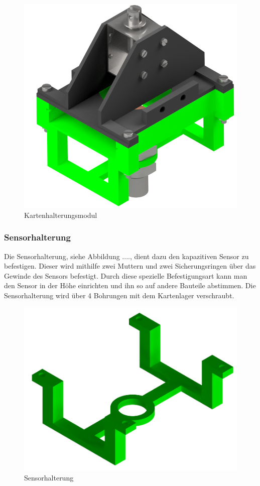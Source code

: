 \begin{figure}
    \centering
    \includegraphics[scale=0.5,page=1]{fig/mech/Kartenhalterungsmodul.png}
    \caption{Kartenhalterungsmodul}
\end{figure}

\subsubsection{Sensorhalterung}
Die Sensorhalterung, siehe Abbildung ...., dient dazu den kapazitiven Sensor zu befestigen. Dieser wird mithilfe zwei Muttern und zwei Sicherungsringen
über das Gewinde des Sensors befestigt. Durch diese spezielle Befestigungsart kann man den Sensor in der Höhe einrichten und ihn so
auf andere Bauteile abstimmen. Die Sensorhalterung wird über 4 Bohrungen mit dem Kartenlager verschraubt.

\begin{figure}
    \centering
    \includegraphics[scale=0.5,page=1]{fig/mech/Sensorhalterung neu.png}
    \caption{Sensorhalterung}
\end{figure}

